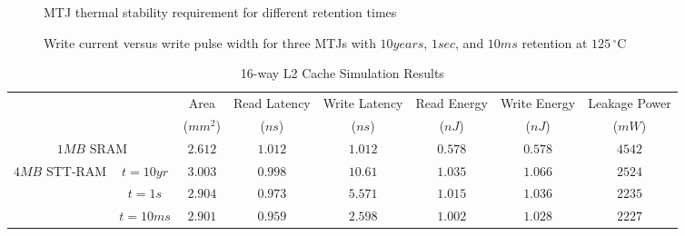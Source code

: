 \begin{figure*} [t]
\centering
\begin{minipage}{0.575\textwidth}
\centering
 \caption{\label{fig:retention} MTJ thermal stability requirement for different retention times}
\end{minipage}
\hfill
\begin{minipage}{0.375\textwidth}
\centering
 \caption{\label{fig:currentVStime} Write current versus write pulse width for three MTJs with $10years$, $1sec$, and $10ms$ retention at $125\,^{\circ}\mathrm{C}$ }
\end{minipage}
\end{figure*}



\begin{table*}[t]
 \scriptsize
  \centering
  \caption{16-way L2 Cache Simulation Results}
  \label{allcaches}
  \begin{tabular}{| c | c | c | c | c | c | c | c |}
    \hline\hline
    \multirow{2}{*}{} & & Area  & Read Latency & Write Latency & Read Energy & Write Energy & Leakage Power\\
  & & ($mm^2$) & ($ns$) & ($ns$) & ($nJ$) & ($nJ$) & ($mW$) \\
    \hline\hline
    \multicolumn{2}{|c|}{$1MB$ SRAM} & $2.612$ & $1.012$ & $1.012$ & $0.578$ & $0.578$ & $4542$ \\
    \hline
    \multirow{3}{*}{$4MB$ STT-RAM} & $t=10yr$ & $3.003$ & $0.998$ & $10.61$ & $1.035$ & $1.066$ & $2524$ \\
    & {$t=1s$} & $2.904$ & $0.973$ & $5.571$ & $1.015$ & $1.036$ & $2235$ \\
    & {$t=10ms$} & $2.901$ & $0.959$ & $2.598$ & $1.002$ & $1.028$ & $2227$ \\
    \hline\hline
  \end{tabular}
\end{table*}

